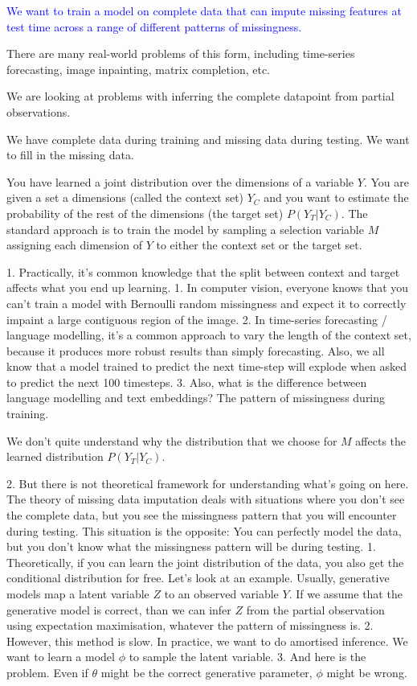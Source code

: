 \documentclass[a4paper,12pt,twoside,openright]{article}
\newcommand{\draft}[1]{\textcolor{blue}{#1}}
\begin{document}
\draft{We want to train a model on complete data that can impute missing features at test time across a range of different patterns of missingness.}

There are many real-world problems of this form, including time-series forecasting, image inpainting, matrix completion, etc.

We are looking at problems with inferring the complete datapoint from partial observations.

We have complete data during training and missing data during testing. We want to fill in the missing data.

You have learned a joint distribution over the dimensions of a variable $Y$. You are given a set a dimensions (called the context set) $Y_C$ and you want to estimate the probability of the rest of the dimensions (the target set) $P(Y_T | Y_C)$. The standard approach is to train the model by sampling a selection variable $M$ assigning each dimension of $Y$ to either the context set or the target set.

1. Practically, it's common knowledge that the split between context and target affects what you end up learning. 1. In computer vision, everyone knows that you can't train a model with Bernoulli random missingness and expect it to correctly impaint a large contiguous region of the image. 2. In time-series forecasting / language modelling, it's a common approach to vary the length of the context set, because it produces more robust results than simply forecasting. Also, we all know that a model trained to predict the next time-step will explode when asked to predict the next 100 timesteps. 3. Also, what is the difference between language modelling and text embeddings? The pattern of missingness during training.

We don't quite understand why the distribution that we choose for $M$ affects the learned distribution $P(Y_T | Y_C)$. 

2. But there is not theoretical framework for understanding what's going on here. The theory of missing data imputation deals with situations where you don't see the complete data, but you see the missingness pattern that you will encounter during testing. This situation is the opposite: You can perfectly model the data, but you don't know what the missingness pattern will be during testing.
    1. Theoretically, if you can learn the joint distribution of the data, you also get the conditional distribution for free. Let's look at an example. Usually, generative models map a latent variable $Z$ to an observed variable $Y$. If we assume that the generative model is correct, than we can infer $Z$ from the partial observation using expectation maximisation, whatever the pattern of missingness is.
    2. However, this method is slow. In practice, we want to do amortised inference. We want to learn a model $\phi$ to sample the latent variable. 
    3. And here is the problem. Even if $\theta$ might be the correct generative parameter, $\phi$ might be wrong.
\end{document}
